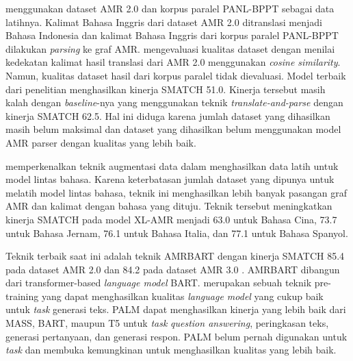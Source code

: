\textcite{putra2022} menggunakan dataset AMR 2.0 dan korpus paralel PANL-BPPT sebagai data latihnya.
Kalimat Bahasa Inggris dari dataset AMR 2.0 ditranslasi menjadi Bahasa Indonesia dan kalimat Bahasa Inggris dari korpus paralel PANL-BPPT dilakukan \textit{parsing} ke graf \gls{AMR}.
\textcite{putra2022} mengevaluasi kualitas dataset dengan menilai kedekatan kalimat hasil translasi dari AMR 2.0 menggunakan \textit{cosine similarity}.
Namun, kualitas dataset hasil \amrparsing{} dari korpus paralel tidak dievaluasi.
Model terbaik dari penelitian \textcite{putra2022} menghasilkan kinerja SMATCH 51.0.
Kinerja tersebut masih kalah dengan \textit{baseline}-nya yang menggunakan teknik \textit{translate-and-parse} dengan kinerja SMATCH 62.5.
Hal ini diduga karena jumlah dataset yang dihasilkan masih belum maksimal dan dataset yang dihasilkan belum menggunakan model AMR parser dengan kualitas yang lebih baik.

\textcite{lee2022} memperkenalkan teknik augmentasi data dalam menghasilkan data latih untuk model \amrparsing{} lintas bahasa.
Karena keterbatasan jumlah dataset yang dipunya untuk melatih model \amrparsing{} lintas bahasa, teknik ini menghasilkan lebih banyak pasangan graf \gls{AMR} dan kalimat dengan bahasa yang dituju.
Teknik tersebut meningkatkan kinerja SMATCH pada model XL-AMR  menjadi 63.0 untuk Bahasa Cina, 73.7 untuk Bahasa Jernam, 76.1 untuk Bahasa Italia, dan 77.1 untuk Bahasa Spanyol.

Teknik \amrparsing{} terbaik saat ini adalah teknik AMRBART dengan kinerja SMATCH 85.4 pada dataset \gls{AMR} 2.0 dan 84.2 pada dataset \gls{AMR} 3.0 .
AMRBART dibangun dari transformer-based \textit{language model} \gls{BART}.
 merupakan sebuah teknik pre-training yang dapat menghasilkan kualitas \textit{language model} yang cukup baik untuk \textit{task} generasi teks.
\gls{PALM} dapat menghasilkan kinerja yang lebih baik dari \gls{MASS}, \gls{BART}, maupun T5 untuk \textit{task} \textit{question answering}, peringkasan teks, generasi pertanyaan, dan generasi respon.
\gls{PALM} belum pernah digunakan untuk \textit{task} \amrparsing{} dan membuka kemungkinan untuk menghasilkan kualitas yang lebih baik.
